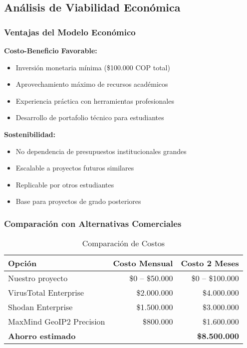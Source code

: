 \subsection{Análisis de Viabilidad Económica}

\subsubsection{Ventajas del Modelo Económico}

\textbf{Costo-Beneficio Favorable:}
\begin{itemize}
    \item Inversión monetaria mínima (\$100.000 COP total)
    \item Aprovechamiento máximo de recursos académicos
    \item Experiencia práctica con herramientas profesionales
    \item Desarrollo de portafolio técnico para estudiantes
\end{itemize}

\textbf{Sostenibilidad:}
\begin{itemize}
    \item No dependencia de presupuestos institucionales grandes
    \item Escalable a proyectos futuros similares
    \item Replicable por otros estudiantes
    \item Base para proyectos de grado posteriores
\end{itemize}

\subsubsection{Comparación con Alternativas Comerciales}

\begin{table}[H]
    \centering
    \small
    \begin{tabular}{|l|r|r|}
        \hline
        \textbf{Opción} & \textbf{Costo Mensual} & \textbf{Costo 2 Meses} \\
        \hline
        Nuestro proyecto & \$0 -- \$50.000 & \$0 -- \$100.000 \\
        \hline
        VirusTotal Enterprise & \$2.000.000 & \$4.000.000 \\
        \hline
        Shodan Enterprise & \$1.500.000 & \$3.000.000 \\
        \hline
        MaxMind GeoIP2 Precision & \$800.000 & \$1.600.000 \\
        \hline
        \textbf{Ahorro estimado} & & \textbf{\$8.500.000} \\
        \hline
    \end{tabular}
    \caption{Comparación de Costos}
    \label{tab:comparacion_costos}
\end{table}

